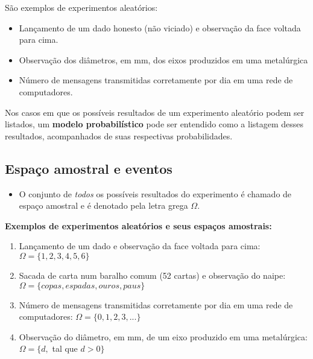 \documentclass[10pt]{article}
\begin{document}
\par São exemplos de experimentos aleatórios:
\begin{itemize}
    \item Lançamento de um dado honesto (não viciado) e observação da face voltada para cima.
    \item Observação dos diâmetros, em mm, dos eixos produzidos em uma metalúrgica
    \item Número de mensagens transmitidas corretamente por dia em uma rede de computadores.
\end{itemize}

\par Nos casos em que os possíveis resultados de um experimento aleatório podem ser listados,
um \textbf{modelo probabilístico} pode ser entendido como a listagem desses resultados, acompanhados
de suas respectivas probabilidades.

\subsection{Espaço amostral e eventos}

\begin{itemize}
    \item O conjunto de \textit{todos} os possíveis resultados do experimento é chamado de espaço 
    amostral e é denotado pela letra grega \begin{math} \Omega \end{math}.
\end{itemize}

\textbf{Exemplos de experimentos aleatórios e seus espaços amostrais:}
\begin{enumerate}
    \item Lançamento de um dado e observação da face voltada para cima:
        \begin{math} \Omega = \{1,2,3,4,5,6\} \end{math}
    \item Sacada de carta num baralho comum (52 cartas) e observação do naipe:
        \begin{math} \Omega = \{copas, espadas, ouros, paus\} \end{math}
    \item Número de mensagens transmitidas corretamente por dia em uma rede de computadores:
        \begin{math} \Omega = \{0,1,2,3,...\} \end{math}
    \item Observação do diâmetro, em mm, de um eixo produzido em uma metalúrgica:
        \begin{math} \Omega = \{d, \end{math} tal que \begin{math} d > 0\} \end{math} 
\end{enumerate}
\end{document}
